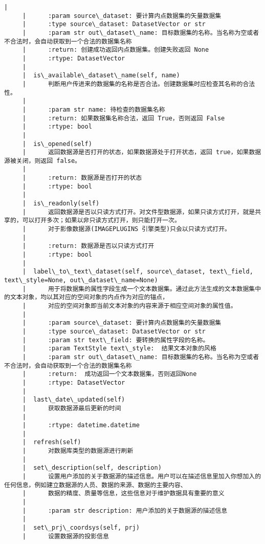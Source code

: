 \documentclass[11pt]{article}
\begin{document}
\begin{Verbatim}[commandchars=\\\{\}]
     |      
     |      :param source\_dataset: 要计算内点数据集的矢量数据集
     |      :type source\_dataset: DatasetVector or str
     |      :param str out\_dataset\_name: 目标数据集的名称。当名称为空或者不合法时，会自动获取到一个合法的数据集名称
     |      :return: 创建成功返回内点数据集。创建失败返回 None
     |      :rtype: DatasetVector
     |  
     |  is\_available\_dataset\_name(self, name)
     |      判断用户传进来的数据集的名称是否合法。创建数据集时应检查其名称的合法性。
     |      
     |      :param str name: 待检查的数据集名称
     |      :return: 如果数据集名称合法，返回 True，否则返回 False
     |      :rtype: bool
     |  
     |  is\_opened(self)
     |      返回数据源是否打开的状态，如果数据源处于打开状态，返回 true，如果数据源被关闭，则返回 false。
     |      
     |      :return: 数据源是否打开的状态
     |      :rtype: bool
     |  
     |  is\_readonly(self)
     |      返回数据源是否以只读方式打开。对文件型数据源，如果只读方式打开，就是共享的，可以打开多次；如果以非只读方式打开，则只能打开一次。
     |      对于影像数据源(IMAGEPLUGINS 引擎类型)只会以只读方式打开。
     |      
     |      :return: 数据源是否以只读方式打开
     |      :rtype: bool
     |  
     |  label\_to\_text\_dataset(self, source\_dataset, text\_field, text\_style=None, out\_dataset\_name=None)
     |      用于将数据集的属性字段生成一个文本数据集。通过此方法生成的文本数据集中的文本对象，均以其对应的空间对象的内点作为对应的锚点，
     |      对应的空间对象即当前文本对象的内容来源于相应空间对象的属性值。
     |      
     |      :param source\_dataset: 要计算内点数据集的矢量数据集
     |      :type source\_dataset: DatasetVector or str
     |      :param str text\_field: 要转换的属性字段的名称。
     |      :param TextStyle text\_style:  结果文本对象的风格
     |      :param str out\_dataset\_name: 目标数据集的名称。当名称为空或者不合法时，会自动获取到一个合法的数据集名称
     |      :return:  成功返回一个文本数据集，否则返回None
     |      :rtype: DatasetVector
     |  
     |  last\_date\_updated(self)
     |      获取数据源最后更新的时间
     |      
     |      :rtype: datetime.datetime
     |  
     |  refresh(self)
     |      对数据库类型的数据源进行刷新
     |  
     |  set\_description(self, description)
     |      设置用户添加的关于数据源的描述信息。用户可以在描述信息里加入你想加入的任何信息，例如建立数据源的人员、数据的来源、数据的主要内容、
     |      数据的精度、质量等信息，这些信息对于维护数据具有重要的意义
     |      
     |      :param str description: 用户添加的关于数据源的描述信息
     |  
     |  set\_prj\_coordsys(self, prj)
     |      设置数据源的投影信息

\end{Verbatim}
\end{document}
